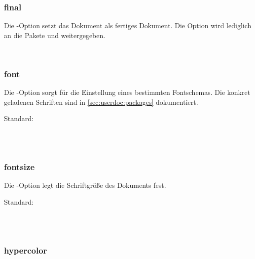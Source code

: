 \subsubsection{final}

Die -Option setzt das Dokument als fertiges Dokument.
Die Option wird lediglich an die Pakete  und  weitergegeben.

\begin{nutzung}
		\>\\
\end{nutzung}

\subsubsection{font}

Die -Option sorgt für die Einstellung eines bestimmten Fontschemas.
Die konkret geladenen Schriften sind in \autoref{sec:userdoc:packages} dokumentiert.

Standard: 

\begin{nutzung}
		\>\\
	\beispiel
		\>\\
		\>
\end{nutzung}

\subsubsection{fontsize}

Die -Option legt die Schriftgröße des Dokuments fest.

Standard: \option{11pt}

\begin{nutzung}
		\>\\
	\beispiel
		\>\\
		\>
\end{nutzung}

\subsubsection{hypercolor}

